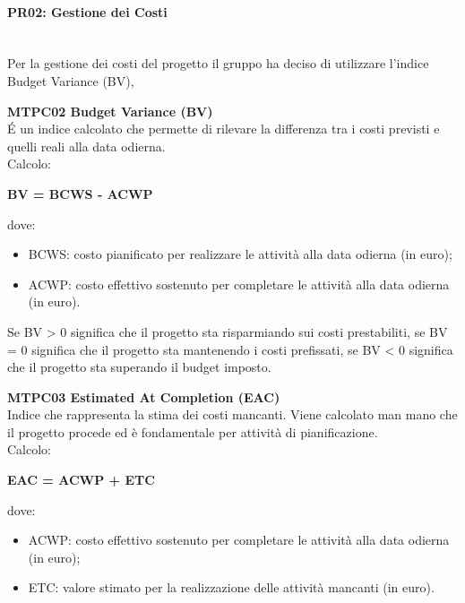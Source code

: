 \paragraph{PR02: Gestione dei Costi} \-\\
Per la gestione dei costi del progetto il gruppo ha deciso di utilizzare l'indice Budget Variance (BV),

\begin{itemize}

\item \textbf{MTPC02 Budget Variance (BV)}\-\\
\'E un indice calcolato che permette di rilevare la differenza tra i costi previsti e quelli reali alla data odierna. \\
Calcolo:
\begin{center}
	\item \textbf{BV = BCWS - ACWP}
\end{center} 
dove:
\begin{itemize}
	\item BCWS: costo pianificato per realizzare le attività alla data odierna (in euro);
	\item ACWP: costo effettivo sostenuto per completare le attività alla data odierna (in euro).
\end{itemize}
Se BV > 0 significa che il progetto sta risparmiando sui costi prestabiliti, se BV = 0 significa che il progetto sta mantenendo i costi prefissati, se BV < 0 significa che il progetto sta superando il budget imposto.

\item \textbf{MTPC03 Estimated At Completion (EAC)}\-\\
Indice che rappresenta la stima dei costi mancanti. Viene calcolato man mano che il progetto procede ed è fondamentale per attività di pianificazione. \\
Calcolo:
\begin{center}
	\item \textbf{EAC = ACWP + ETC}
\end{center}
dove:
\begin{itemize}
	\item ACWP: costo effettivo sostenuto per completare le attività alla data odierna (in euro);
	\item ETC: valore stimato per la realizzazione delle attività mancanti (in euro).
\end{itemize}

\end{itemize}

